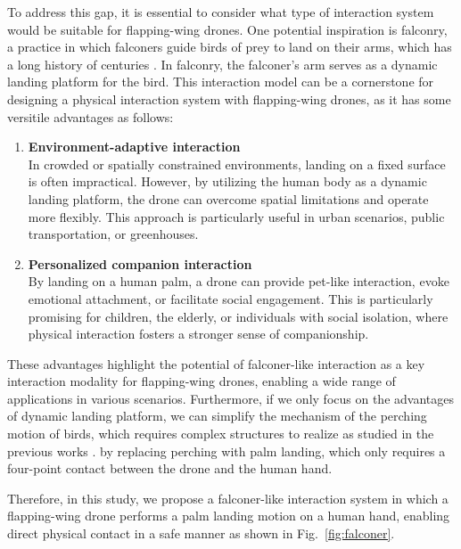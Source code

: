 To address this gap, it is essential to consider what type of interaction system would be suitable for flapping-wing drones.
One potential inspiration is falconry, a practice in which falconers guide birds of prey to land on their arms, which has a long history of centuries \cite{oggins2019falconry}.
In falconry, the falconer's arm serves as a dynamic landing platform for the bird.
This interaction model can be a cornerstone for designing a physical interaction system with flapping-wing drones, 
as it has some versitile advantages as follows:
\begin{enumerate}
    \item \textbf{Environment-adaptive interaction}\\  
    In crowded or spatially constrained environments, landing on a fixed surface is often impractical.  
    However, by utilizing the human body as a dynamic landing platform, the drone can overcome spatial limitations and operate more flexibly.  
    This approach is particularly useful in urban scenarios, public transportation, or greenhouses.
    \item \textbf{Personalized companion interaction}\\  
    By landing on a human palm, a drone can provide pet-like interaction, evoke emotional attachment, or facilitate social engagement.  
    This is particularly promising for children, the elderly, or individuals with social isolation, where physical interaction fosters a stronger sense of companionship.
\end{enumerate}
These advantages highlight the potential of falconer-like interaction as a key interaction modality for flapping-wing drones, enabling a wide range of applications in various scenarios.
Furthermore, if we only focus on the advantages of dynamic landing platform, we can simplify the mechanism of the perching motion of birds, which requires complex structures to realize as studied in the previous works \cite{roderick2021bird-inspired-perching}.
by replacing perching with palm landing, which only requires a four-point contact between the drone and the human hand.

Therefore, in this study, we propose a falconer-like interaction system in which a flapping-wing drone performs a palm landing motion on a human hand, enabling direct physical contact in a safe manner as shown in Fig.~\ref{fig:falconer}.


